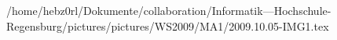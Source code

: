 /home/hebz0rl/Dokumente/collaboration/Informatik---Hochschule-Regensburg/pictures/pictures/WS2009/MA1/2009.10.05-IMG1.tex
